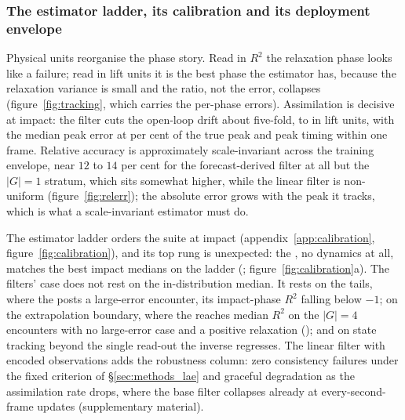 
\subsubsection{The estimator ladder, its calibration and its deployment envelope}
\label{sec:res_da}

Physical units reorganise the phase story. Read in $R^2$ the relaxation
phase looks like a failure; read in lift units it is the best phase the estimator
has, because the relaxation variance is small and the ratio, not the error,
collapses (figure~\ref{fig:tracking}, which carries the per-phase errors).
Assimilation is decisive at impact: the filter cuts the open-loop drift about
five-fold, to \DapRexImpRmse{} in lift units, with the median peak error at
\DapRexPeakErr{} per cent of the true peak and peak timing within one
frame. Relative accuracy is approximately scale-invariant across the training
envelope, near $12$ to $14$ per cent for the
forecast-derived filter at all but the $|G| = 1$ stratum, which sits somewhat
higher, while the linear filter is non-uniform
(figure~\ref{fig:relerr}); the absolute error grows with the peak it
tracks, which is what a scale-invariant estimator must do.\re

The estimator ladder orders the suite at impact
(appendix~\ref{app:calibration}, figure~\ref{fig:calibration}), and its top rung is unexpected:
the \StaticInv, no dynamics at all, matches the best
\TestSplit{} impact medians on the ladder (\DapEobsImpRTwo;
figure~\ref{fig:calibration}a). The filters' case does not rest
on the in-distribution median. It rests on the tails, where the
\StaticInv{} posts a large-error encounter, its impact-phase
$R^2$ falling below $-1$; on the
extrapolation boundary, where the \TwoStageKF{} reaches
\PoneTwoStageCovImpactC{} median $R^2$ on the $|G| = 4$ \BoundarySplit{}
encounters with no large-error case and a positive relaxation
(\PoneTwoStageCovRelaxC); and on state tracking beyond the single read-out
the inverse regresses. The linear filter with encoded observations adds
the robustness column: zero consistency failures under the fixed criterion of
\S\ref{sec:methods_lae} and graceful degradation as the assimilation rate
drops, where the base filter collapses already at
every-second-frame updates (supplementary material).\re


